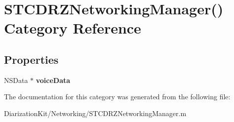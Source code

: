 \hypertarget{category_s_t_c_d_r_z_networking_manager_07_08}{}\section{S\+T\+C\+D\+R\+Z\+Networking\+Manager() Category Reference}
\label{category_s_t_c_d_r_z_networking_manager_07_08}
\subsection*{Properties}
\begin{DoxyCompactItemize}
\item 
\hypertarget{category_s_t_c_d_r_z_networking_manager_07_08_aadae1e44bac1b781d9a7378aac6ce702}{}\label{category_s_t_c_d_r_z_networking_manager_07_08_aadae1e44bac1b781d9a7378aac6ce702} 
N\+S\+Data $\ast$ {\bfseries voice\+Data}
\end{DoxyCompactItemize}


The documentation for this category was generated from the following file\+:\begin{DoxyCompactItemize}
\item 
Diarization\+Kit/\+Networking/S\+T\+C\+D\+R\+Z\+Networking\+Manager.\+m\end{DoxyCompactItemize}
